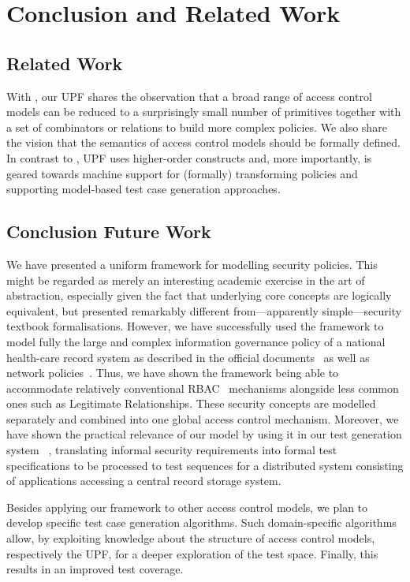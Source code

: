 \chapter{Conclusion and Related Work}
\section{Related Work}
With \citet{barker:next:2009}, our UPF shares the observation
that a broad range of access control models can be reduced to a
surprisingly small number of primitives together with a set of
combinators or relations to build more complex policies. We also share
the vision that the semantics of access control models should be
formally defined.  In contrast to \cite{barker:next:2009}, UPF
uses higher-order constructs and, more importantly, is geared towards
machine support for (formally) transforming policies and supporting
model-based test case generation approaches.

\section{Conclusion Future Work}
We have presented a uniform framework for modelling security
policies. This might be regarded as merely an interesting academic
exercise in the art of abstraction, especially given the fact that
underlying core concepts are logically equivalent, but presented
remarkably different from---apparently simple---security textbook
formalisations.  However, we have successfully used the framework to
model fully the large and complex information governance policy of a
national health-care record system as described in the official
documents~\cite{brucker.ea:model-based:2011} as well as network
policies~\cite{brucker.ea:formal-fw-testing:2014}. Thus, we have shown
the framework being able to accommodate relatively conventional
RBAC~\cite{sandhu.ea:role-based:1996} mechanisms alongside less common
ones such as Legitimate Relationships. These security concepts are
modelled separately and combined into one global access control
mechanism.  Moreover, we have shown the practical relevance of our
model by using it in our test generation system
\testgen~\cite{brucker.ea:theorem-prover:2012}, translating informal
security requirements into formal test specifications to be processed
to test sequences for a distributed system consisting of applications
accessing a central record storage system.

Besides applying our framework to other access control models, we plan
to develop specific test case generation algorithms. Such
domain-specific algorithms allow, by exploiting knowledge about the
structure of access control models, respectively the UPF, for a
deeper exploration of the test space. Finally, this results in an
improved test coverage.
